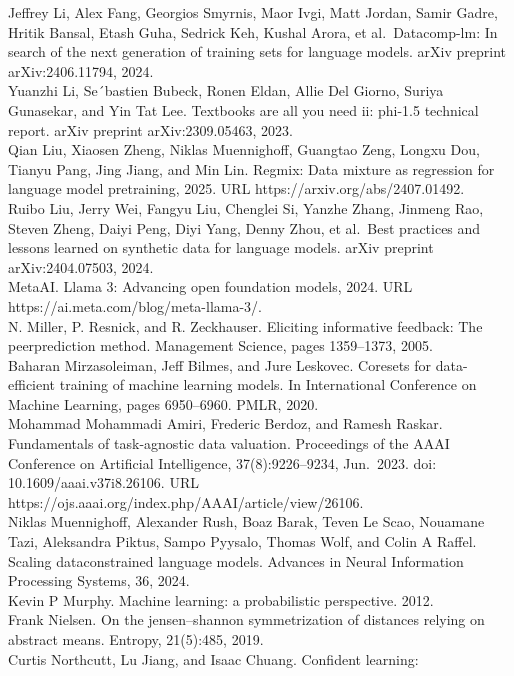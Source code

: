 Jeffrey Li, Alex Fang, Georgios Smyrnis, Maor Ivgi, Matt Jordan, Samir
Gadre, Hritik Bansal, Etash Guha, Sedrick Keh, Kushal Arora, et
al.~Datacomp-lm: In search of the next generation of training sets for
language models. arXiv preprint arXiv:2406.11794, 2024.\\
Yuanzhi Li, Se´bastien Bubeck, Ronen Eldan, Allie Del Giorno, Suriya
Gunasekar, and Yin Tat Lee. Textbooks are all you need ii: phi-1.5
technical report. arXiv preprint arXiv:2309.05463, 2023.\\
Qian Liu, Xiaosen Zheng, Niklas Muennighoff, Guangtao Zeng, Longxu Dou,
Tianyu Pang, Jing Jiang, and Min Lin. Regmix: Data mixture as regression
for language model pretraining, 2025. URL
https://arxiv.org/abs/2407.01492.\\
Ruibo Liu, Jerry Wei, Fangyu Liu, Chenglei Si, Yanzhe Zhang, Jinmeng
Rao, Steven Zheng, Daiyi Peng, Diyi Yang, Denny Zhou, et al.~Best
practices and lessons learned on synthetic data for language models.
arXiv preprint arXiv:2404.07503, 2024.\\
MetaAI. Llama 3: Advancing open foundation models, 2024. URL
https://ai.meta.com/blog/meta-llama-3/.\\
N. Miller, P. Resnick, and R. Zeckhauser. Eliciting informative
feedback: The peerprediction method. Management Science, pages
1359--1373, 2005.\\
Baharan Mirzasoleiman, Jeff Bilmes, and Jure Leskovec. Coresets for
data-efficient training of machine learning models. In International
Conference on Machine Learning, pages 6950--6960. PMLR, 2020.\\
Mohammad Mohammadi Amiri, Frederic Berdoz, and Ramesh Raskar.
Fundamentals of task-agnostic data valuation. Proceedings of the AAAI
Conference on Artificial Intelligence, 37(8):9226--9234, Jun.~2023. doi:
10.1609/aaai.v37i8.26106. URL
https://ojs.aaai.org/index.php/AAAI/article/view/26106.\\
Niklas Muennighoff, Alexander Rush, Boaz Barak, Teven Le Scao, Nouamane
Tazi, Aleksandra Piktus, Sampo Pyysalo, Thomas Wolf, and Colin A Raffel.
Scaling dataconstrained language models. Advances in Neural Information
Processing Systems, 36, 2024.\\
Kevin P Murphy. Machine learning: a probabilistic perspective. 2012.\\
Frank Nielsen. On the jensen--shannon symmetrization of distances
relying on abstract means. Entropy, 21(5):485, 2019.\\
Curtis Northcutt, Lu Jiang, and Isaac Chuang. Confident learning:
